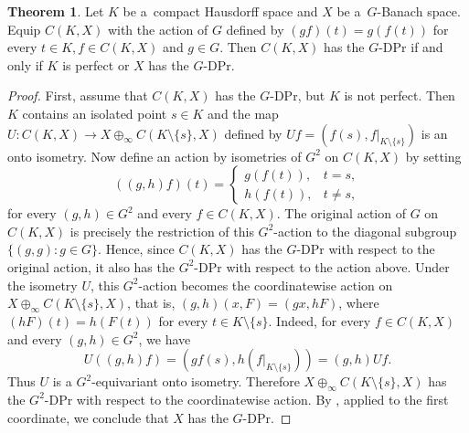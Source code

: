\documentclass[a4paper,12pt]{amsart}
\theoremstyle{definition}
\newtheorem{theorem}{Theorem}[section]
\theoremstyle{definition}
\theoremstyle{remark}
\numberwithin{equation}{section}
\newcommand{\<}{\langle}
\renewcommand{\>}{\rangle}
\begin{document}
	\begin{theorem} \label{thm:c-of-K-X}
		Let $K$ be a~compact Hausdorff space and $X$ be a~$G$-Banach space. Equip $C(K, X)$ with the action of $G$ defined by $(gf)(t) = g(f(t))$ for every $t \in K, f \in C(K, X)$ and $g \in G$. Then $C(K, X)$ has the $G$-DPr if and only if $K$ is perfect or $X$ has the $G$-DPr.
	\end{theorem}
	\begin{proof} First, assume that $C(K,X)$ has the $G$-DPr, but $K$ is not perfect. Then $K$ contains an isolated point $s\in K$ and the map $U:C(K,X)\longrightarrow X\oplus_\infty C(K\setminus\{s\},X)$ defined by  $Uf=(f(s),f|_{K\setminus\{s\}})$ is an onto isometry. Now define an action by isometries of $G^2$ on $C(K,X)$ by setting
		\begin{equation*}
			((g,h)f)(t)
			=
			\begin{cases}
				g(f(t)), & t=s,\\
				h(f(t)), & t\neq s,
			\end{cases}
		\end{equation*}
		for every $(g,h)\in G^2$ and every $f\in C(K,X)$. The original action of $G$ on $C(K,X)$ is precisely the restriction of this $G^2$-action to the diagonal subgroup $\{(g,g):g\in G\}$. Hence, since $C(K,X)$ has the $G$-DPr with respect to the original action, it also has the $G^2$-DPr with respect to the action above. Under the isometry $U$, this $G^2$-action becomes the coordinatewise action on $X\oplus_\infty C(K\setminus\{s\},X)$, that is, $(g,h)(x,F)=(gx,hF)$, where $(hF)(t)=h(F(t))$ for every $t\in K\setminus\{s\}$. Indeed, for every $f\in C(K,X)$ and every $(g,h)\in G^2$, we have
		\begin{equation*}
			U((g,h)f)
			=
			(g f(s),h(f|_{K\setminus\{s\}}))
			=
			(g,h)Uf.
		\end{equation*}
		Thus $U$ is a $G^2$-equivariant onto isometry. Therefore $X\oplus_{\infty} C(K\setminus\{s\},X)$ has the $G^2$-DPr with respect to the coordinatewise action. By , applied to the first coordinate, we conclude that $X$ has the $G$-DPr.
		

\end{proof}
\end{document}
